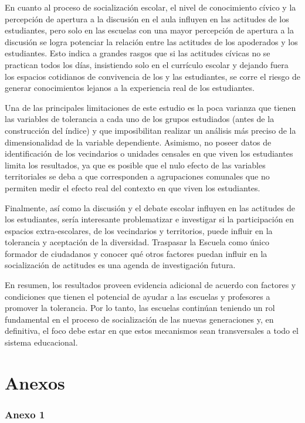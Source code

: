 \documentclass[12pt,twoside]{templates/facsothesis}
\begin{document}
En cuanto al proceso de socialización escolar, el nivel de conocimiento cívico y la percepción de apertura a la discusión en el aula influyen en las actitudes de los estudiantes, pero solo en las escuelas con una mayor percepción de apertura a la discusión se logra potenciar la relación entre las actitudes de los apoderados y los estudiantes. Esto indica a grandes rasgos que si las actitudes cívicas no se practican todos los días, insistiendo solo en el currículo escolar y dejando fuera los espacios cotidianos de convivencia de los y las estudiantes, se corre el riesgo de generar conocimientos lejanos a la experiencia real de los estudiantes.

Una de las principales limitaciones de este estudio es la poca varianza que tienen las variables de tolerancia a cada uno de los grupos estudiados (antes de la construcción del índice) y que imposibilitan realizar un análisis más preciso de la dimensionalidad de la variable dependiente. Asimismo, no poseer datos de identificación de los vecindarios o unidades censales en que viven los estudiantes limita los resultados, ya que es posible que el nulo efecto de las variables territoriales se deba a que corresponden a agrupaciones comunales que no permiten medir el efecto real del contexto en que viven los estudiantes.

Finalmente, así como la discusión y el debate escolar influyen en las actitudes de los estudiantes, sería interesante problematizar e investigar si la participación en espacios extra-escolares, de los vecindarios y territorios, puede influir en la tolerancia y aceptación de la diversidad. Traspasar la Escuela como único formador de ciudadanos y conocer qué otros factores puedan influir en la socialización de actitudes es una agenda de investigación futura.

En resumen, los resultados proveen evidencia adicional de acuerdo con factores y condiciones que tienen el potencial de ayudar a las escuelas y profesores a promover la tolerancia. Por lo tanto, las escuelas continúan teniendo un rol fundamental en el proceso de socialización de las nuevas generaciones y, en definitiva, el foco debe estar en que estos mecanismos sean transversales a todo el sistema educacional.

\hypertarget{anexos}{%
\chapter{Anexos}\label{anexos}}

\hypertarget{anexo-1}{%
\subsection{Anexo 1}\label{anexo-1}}
\end{document}
